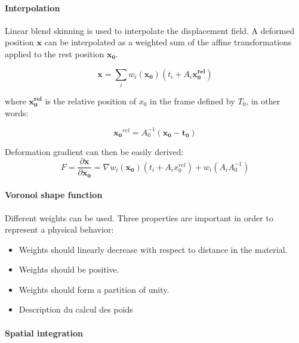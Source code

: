\paragraph{Interpolation}
Linear blend skinning is used to interpolate the displacement field. A deformed position $\mathbf{x}$ can be interpolated as a weighted sum of the affine transformations applied to the rest position $\mathbf{x_{0}}$.

\begin{equation}
\mathbf{x} = \sum_{i} w_{i}(\mathbf{x_{0}})\left(t_{i}+A_{i}\mathbf{x_{0}^{rel}}\right)
\end{equation}

where $\mathbf{x_{0}^{rel}}$ is the relative position of $x_{0}$ in the frame defined by $T_{0}$, in other words:

\begin{equation}
\mathbf{x_{0}}^{rel} = A_{0}^{-1}\left( \mathbf{x_{0}} - \mathbf{t_{0}} \right)
\end{equation}

Deformation gradient can then be easily derived:
\begin{equation}
F = \frac{\partial \mathbf{x}}{\partial \mathbf{x_{0}}} =
\nabla w_{i}(\mathbf{x_{0}}) \left( t_{i}+A_{i}x_{0}^{rel}\right) + 
w_{i}\left( A_{i}A_{0}^{-1} \right)
\end{equation}

\paragraph{Voronoi shape function}

Different weights can be used. Three properties are important in order to represent a physical behavior:

\begin{itemize}
\item Weights should linearly decrease with respect to distance in the material.
\item Weights should be positive.
\item Weights should form a partition of unity.
\end{itemize}

\begin{itemize}
\item Description du calcul des poids
\end{itemize}

\paragraph{Spatial integration}

